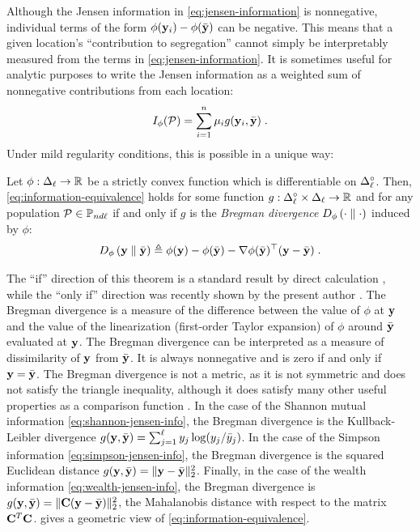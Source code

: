 Although the Jensen information in \cref{eq:jensen-information} is nonnegative, individual terms of the form $\phi(\mathbf{y}_i) - \phi(\bar{\mathbf{y}}) $ can be negative. 
This means that a given location's ``contribution to segregation'' cannot simply be interpretably measured from the terms in \cref{eq:jensen-information}.
It is sometimes useful for analytic purposes to write the Jensen information as a weighted sum of nonnegative contributions from each location: 
\begin{align}
  I_{\phi}(\mathcal{P}) = \sum_{i = 1}^n \mu_i g(\mathbf{y}_i, \bar{\mathbf{y}}) \;. \label{eq:information-equivalence}
\end{align}
Under mild regularity conditions, this is possible in a unique way: 
\begin{thm}
  Let $\phi: \Delta_{\ell} \rightarrow \mathbb{R}$ be a strictly convex function which is differentiable on $\Delta_{\ell}^{\circ}$. 
  Then, \cref{eq:information-equivalence} holds for some function $g:\Delta_{\ell}^{\circ} \times \Delta_{\ell} \rightarrow \mathbb{R}$ and for any population $\mathcal{P} \in \mathbb{P}_{nd\ell}$ if and only if $g$ is the \emph{Bregman divergence} $D_{\phi}\left( \cdot \;\|\; \cdot \right)$ induced by $\phi$: 
  \begin{align}
    D_{\phi}\left( \mathbf{y} \;\|\; \bar{\mathbf{y}} \right) \triangleq \phi(\mathbf{y}) - \phi(\bar{\mathbf{y}}) - \nabla \phi(\bar{\mathbf{y}})^{\top} (\mathbf{y} - \bar{\mathbf{y}}) \;. \label{eq:bregman-divergence}
  \end{align}
\end{thm}
The ``if'' direction of this theorem is a standard result by direct calculation \cite{banerjeeClusteringBregmanDivergences2005}, while the ``only if'' direction was recently shown by the present author \cite{chodrowEquivalenceInformationsCharacterizes2025b}. 
The Bregman divergence is a measure of the difference between the value of $\phi$ at $\mathbf{y}$ and the value of the linearization (first-order Taylor expansion) of $\phi$ around $\bar{\mathbf{y}}$ evaluated at $\mathbf{y}$.
The Bregman divergence can be interpreted as a measure of dissimilarity of $\mathbf{y}$ from $\bar{\mathbf{y}}$.  
It is always nonnegative and is zero if and only if $\mathbf{y} = \bar{\mathbf{y}}$.
The Bregman divergence is not a metric, as it is not symmetric and does not satisfy the triangle inequality, although it does satisfy many other useful properties as a comparison function \cite{banerjeeClusteringBregmanDivergences2005}. 
In the case of the Shannon mutual information \eqref{eq:shannon-jensen-info}, the Bregman divergence is the Kullback-Leibler divergence $g(\mathbf{y}, \bar{\mathbf{y}}) = \sum_{j = 1}^{\ell} y_j \log(y_j / \bar{y}_j)$. 
In the case of the Simpson information \eqref{eq:simpson-jensen-info}, the Bregman divergence is the squared Euclidean distance $g(\mathbf{y}, \bar{\mathbf{y}}) = \lVert \mathbf{y} - \bar{\mathbf{y}} \rVert_2^2$.
Finally, in the case of the wealth information \eqref{eq:wealth-jensen-info}, the Bregman divergence is $g(\mathbf{y}, \bar{\mathbf{y}}) = \lVert \mathbf{C} (\mathbf{y} - \bar{\mathbf{y}}) \rVert_2^2$, the Mahalanobis distance with respect to the matrix $\mathbf{C}^T\mathbf{C}$.
 gives a geometric view of \cref{eq:information-equivalence}.  

